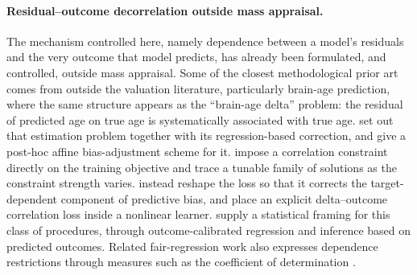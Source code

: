 \documentclass[10pt]{article}
\theoremstyle{definition}
\newcommand{\1}{\mathbf{1}}
\begin{document}
\paragraph{Residual--outcome decorrelation outside mass appraisal.}
The mechanism controlled here, namely dependence between a model's residuals and the
very outcome that model predicts, has already been formulated, and controlled, outside
mass appraisal. Some of the closest methodological prior art comes from outside the
valuation literature, particularly brain-age prediction, where the same structure appears
as the ``brain-age delta'' problem: the residual of predicted age on true age is
systematically associated with true age.
\textcite{SmithEtAl2019} set out that estimation problem together with its
regression-based correction, and \textcite{BeheshtiEtAl2019} give a post-hoc affine
bias-adjustment scheme for it. \textcite{TrederEtAl2021} impose a correlation constraint
directly on the training objective and trace a tunable family of solutions as the
constraint strength varies. \textcite{WangEtAl2023} instead reshape the loss so that it
corrects the target-dependent component of predictive bias, and \textcite{RenEtAl2026}
place an explicit delta--outcome correlation loss inside a nonlinear learner.
\textcite{LeeChen2026} supply a statistical framing for this class of procedures, through
outcome-calibrated regression and inference based on predicted outcomes. Related
fair-regression work also expresses dependence restrictions through measures such as the
coefficient of determination \cite{KomiyamaEtAl2018}.
\end{document}
